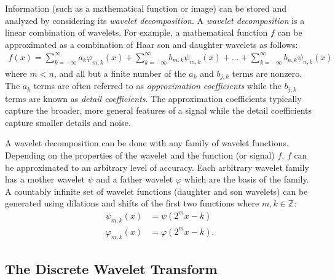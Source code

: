 Information (such as a mathematical function or image) can be stored and analyzed by considering its \emph{wavelet decomposition}.
A \emph{wavelet decomposition} is a linear combination of wavelets.
For example, a mathematical function $f$ can be approximated as a combination of Haar son and daughter wavelets as follows:
\begin{align*}
f(x) = \sum_{k=-\infty}^{\infty} a_k\varphi_{m,k}(x) + \sum_{k=-\infty}^{\infty} b_{m,k}\psi_{m,k}(x) + \dots + \sum_{k=-\infty}^{\infty} b_{n,k}\psi_{n,k}(x)
\end{align*}
where $m<n$, and all but a finite number of the $a_k$ and $b_{j,k}$ terms are nonzero.
The $a_k$ terms are often referred to as \emph{approximation coefficients} while the $b_{j,k}$ terms are known as \emph{detail coefficients}.
The approximation coefficients typically capture the broader, more general features of a signal while the detail coefficients capture smaller details and noise.

A wavelet decomposition can be done with any family of wavelet functions.
Depending on the properties of the wavelet and the function (or signal) $f$, $f$ can be approximated to an arbitrary level of accuracy.
Each arbitrary wavelet family has a mother wavelet $\psi$ and a father wavelet $\varphi$ which are the basis of the family.
A countably infinite set of wavelet functions (daughter and son wavelets) can be generated using dilations and shifts of the first two functions where $m,k \in \mathbb{Z}$:
\begin{align*}
\psi_{m,k}(x) &= \psi(2^mx - k)\\
\varphi_{m,k}(x) &= \varphi(2^mx - k).
\end{align*}

\subsection*{The Discrete Wavelet Transform} %


